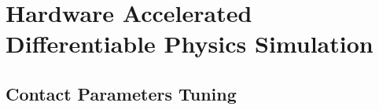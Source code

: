 \chapter{Hardware Accelerated Differentiable Physics Simulation}
\label{chp:contrib_JaxSim}

\section{Contact Parameters Tuning}

